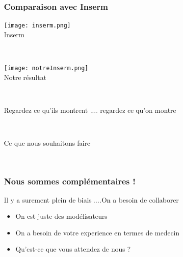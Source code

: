 \documentclass[a4paper]{cours-bdd}
\begin{document}

\begin{frame}[fragile]
  \frametitle{Comparaison avec Inserm}

  \begin{minipage}[b]{0.45\columnwidth}
    \vspace{0.0cm}
    \texttt{[image: inserm.png]} \\
    Inserm 
      \end{minipage}    
  \hfill \ 
  \begin{minipage}[b]{0.45\columnwidth}
        \vspace{0.0cm}
        \texttt{[image: notreInserm.png]} \\
        Notre résultat
      \end{minipage}
      \ 


  Regardez ce qu'ils montrent .... regardez ce qu'on montre 

\end{frame}




\begin{frame}
  \hfill \
  \begin{center}
    \Huge
    Ce que nous souhaitons faire
  \end{center}
  \hfill \

\end{frame}


\begin{frame}[fragile]
  \frametitle{Nous sommes complémentaires !}

  Il y a surement plein de biais ....On a besoin de collaborer

  \begin{itemize}
    \item On est juste des modélisateurs
    \item On a besoin de votre experience en termes de medecin
    \item Qu'est-ce que vous attendez de nous ?
    \end{itemize}

  
\end{frame}
\end{document}
